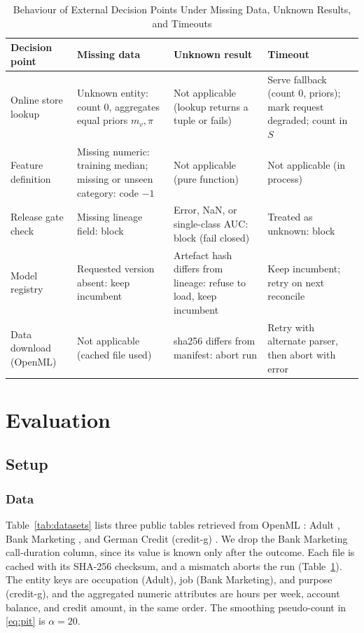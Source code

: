\documentclass[journal]{IEEEtran}
\begin{document}
\begin{table}[!t]
\caption{Behaviour of External Decision Points Under Missing Data, Unknown Results, and Timeouts}
\label{tab:outcomes}
\centering
\footnotesize
\setlength{\tabcolsep}{4pt}
\begin{tabular}{@{}>{\raggedright\arraybackslash}p{2.7cm}>{\raggedright\arraybackslash}p{4.6cm}>{\raggedright\arraybackslash}p{4.6cm}>{\raggedright\arraybackslash}p{4.6cm}@{}}
\toprule
Decision point & Missing data & Unknown result & Timeout \\
\midrule
Online store lookup & Unknown entity: count 0, aggregates equal priors $m_v,\pi$ & Not applicable (lookup returns a tuple or fails) & Serve fallback (count 0, priors); mark request degraded; count in $S$ \\\addlinespace[3pt]
Feature definition & Missing numeric: training median; missing or unseen category: code $-1$ & Not applicable (pure function) & Not applicable (in process) \\\addlinespace[3pt]
Release gate check & Missing lineage field: block & Error, NaN, or single-class AUC: block (fail closed) & Treated as unknown: block \\\addlinespace[3pt]
Model registry & Requested version absent: keep incumbent & Artefact hash differs from lineage: refuse to load, keep incumbent & Keep incumbent; retry on next reconcile \\\addlinespace[3pt]
Data download (OpenML) & Not applicable (cached file used) & sha256 differs from manifest: abort run & Retry with alternate parser, then abort with error \\
\bottomrule
\end{tabular}
\end{table}

\section{Evaluation}
\label{sec:eval}

\subsection{Setup}
\label{sec:setup}

\subsubsection{Data}
Table~\ref{tab:datasets} lists three public tables retrieved from OpenML \cite{vanschoren2014openml}: Adult \cite{uciadult}, Bank Marketing \cite{moro2014bank}, and German Credit (credit-g) \cite{ucigerman}. We drop the Bank Marketing call-duration column, since its value is known only after the outcome. Each file is cached with its SHA-256 checksum, and a mismatch aborts the run (Table~\ref{tab:outcomes}). The entity keys are occupation (Adult), job (Bank Marketing), and purpose (credit-g), and the aggregated numeric attributes are hours per week, account balance, and credit amount, in the same order. The smoothing pseudo-count in \eqref{eq:pit} is $\alpha=20$.
\end{document}
